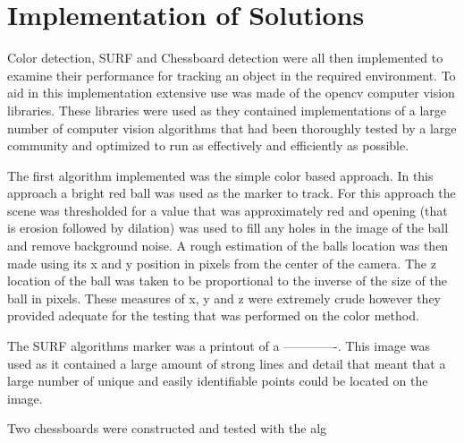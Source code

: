 \section{Implementation of Solutions}

Color detection, SURF and Chessboard detection were all then implemented to examine their performance for tracking an object in the required environment. To aid in this implementation extensive use was made of the opencv computer vision libraries. These libraries were used as they contained implementations of a large number of computer vision algorithms that had been thoroughly tested by a large community and optimized to run as effectively and efficiently as possible.

The first algorithm implemented was the simple color based approach. In this approach a bright red ball was used as the marker to track. For this approach the scene was thresholded for a value that was approximately red and opening (that is erosion followed by dilation) was used to fill any holes in the image of the ball and remove background noise. A rough estimation of the balls location was then made using its x and y position in pixels from the center of the camera. The z location of the ball was taken to be proportional to the inverse of the size of the ball in pixels. These measures of x, y and z were extremely crude however they provided adequate for the testing that was performed on the color method.

The SURF algorithms marker was a printout of a -------------. This image was used as it contained a large amount of strong lines and detail that meant that a large number of unique and easily identifiable points could be located on the image.

Two chessboards were constructed and tested with the alg